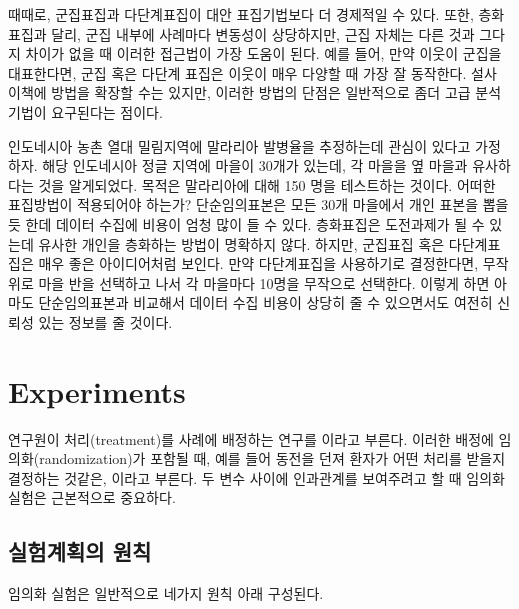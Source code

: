 때때로, 군집표집과 다단계표집이 대안 표집기법보다 더 경제적일 수 있다.
또한, 층화표집과 달리, 군집 내부에 사례마다 변동성이 상당하지만, 근집 자체는 다른 것과 그다지 차이가 없을 때 이러한 접근법이 가장 도움이 된다. 예를 들어, 만약 이웃이 군집을 대표한다면, 군집 혹은 다단계 표집은 이웃이 매우 다양할 때 가장 잘 동작한다.
설사 이책에 방법을 확장할 수는 있지만, 이러한 방법의 단점은 일반적으로 좀더 고급 분석기법이 요구된다는 점이다.

\begin{example}{인도네시아 농촌 열대 밀림지역에 말라리아 발병율을 추정하는데 관심이 있다고 가정하자.
해당 인도네시아 정글 지역에 마을이 30개가 있는데, 각 마을을 옆 마을과 유사하다는 것을 알게되었다.
목적은 말라리아에 대해 150 명을 테스트하는 것이다. 어떠한 표집방법이 적용되어야 하는가?}
단순임의표본은 모든 30개 마을에서 개인 표본을 뽑을 듯 한데 데이터 수집에 비용이 엄청 많이 들 수 있다.
층화표집은 도전과제가 될 수 있는데 유사한 개인을 층화하는 방법이 명확하지 않다.
하지만, 군집표집 혹은 다단계표집은 매우 좋은 아이디어처럼 보인다.
만약 다단계표집을 사용하기로 결정한다면, 무작위로 마을 반을 선택하고 나서 각 마을마다 10명을 무작으로 선택한다.
이렇게 하면 아마도 단순임의표본과 비교해서 데이터 수집 비용이 상당히 줄 수 있으면서도 여전히 신뢰성 있는 정보를 줄 것이다.
\end{example}


\section[실험]{Experiments }
\label{experimentsSection}

연구원이 처리(treatment)를 사례에 배정하는 연구를 이라고 부른다.
이러한 배정에 임의화(randomization)가 포함될 때, 예를 들어 동전을 던져 환자가 어떤 처리를 받을지 결정하는 것같은,
이라고 부른다. 두 변수 사이에 인과관계를 보여주려고 할 때 임의화 실험은 근본적으로 중요하다.

\subsection{실험계획의 원칙}
\label{experimentalDesignPrinciples}

임의화 실험은 일반적으로 네가지 원칙 아래 구성된다.


